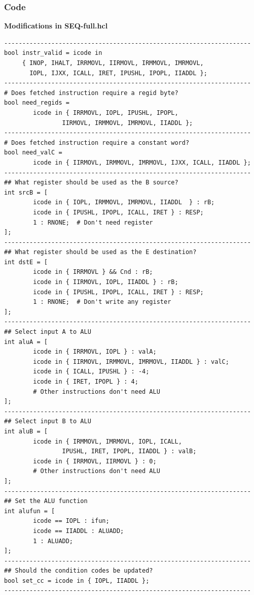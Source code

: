 \documentclass{article}
\begin{document}
\subsubsection{Code}
\begin{center}
        \textbf{Modifications in SEQ-full.hcl}
\end{center}
\begin{lstlisting}
--------------------------------------------------------------------
bool instr_valid = icode in 
     { INOP, IHALT, IRRMOVL, IIRMOVL, IRMMOVL, IMRMOVL,
       IOPL, IJXX, ICALL, IRET, IPUSHL, IPOPL, IIADDL };
--------------------------------------------------------------------
# Does fetched instruction require a regid byte?
bool need_regids =
        icode in { IRRMOVL, IOPL, IPUSHL, IPOPL, 
                IIRMOVL, IRMMOVL, IMRMOVL, IIADDL };
--------------------------------------------------------------------
# Does fetched instruction require a constant word?
bool need_valC =
        icode in { IIRMOVL, IRMMOVL, IMRMOVL, IJXX, ICALL, IIADDL };
--------------------------------------------------------------------
## What register should be used as the B source?
int srcB = [
        icode in { IOPL, IRMMOVL, IMRMOVL, IIADDL  } : rB;
        icode in { IPUSHL, IPOPL, ICALL, IRET } : RESP;
        1 : RNONE;  # Don't need register
];
--------------------------------------------------------------------
## What register should be used as the E destination?
int dstE = [
        icode in { IRRMOVL } && Cnd : rB;
        icode in { IIRMOVL, IOPL, IIADDL } : rB;
        icode in { IPUSHL, IPOPL, ICALL, IRET } : RESP;
        1 : RNONE;  # Don't write any register
];
--------------------------------------------------------------------
## Select input A to ALU
int aluA = [
        icode in { IRRMOVL, IOPL } : valA;
        icode in { IIRMOVL, IRMMOVL, IMRMOVL, IIADDL } : valC;
        icode in { ICALL, IPUSHL } : -4;
        icode in { IRET, IPOPL } : 4;
        # Other instructions don't need ALU
];
--------------------------------------------------------------------
## Select input B to ALU
int aluB = [
        icode in { IRMMOVL, IMRMOVL, IOPL, ICALL, 
                IPUSHL, IRET, IPOPL, IIADDL } : valB;
        icode in { IRRMOVL, IIRMOVL } : 0;
        # Other instructions don't need ALU
];
--------------------------------------------------------------------
## Set the ALU function
int alufun = [
        icode == IOPL : ifun;
        icode == IIADDL : ALUADD;
        1 : ALUADD;
];
--------------------------------------------------------------------
## Should the condition codes be updated?
bool set_cc = icode in { IOPL, IIADDL };
--------------------------------------------------------------------
\end{lstlisting}
\end{document}
